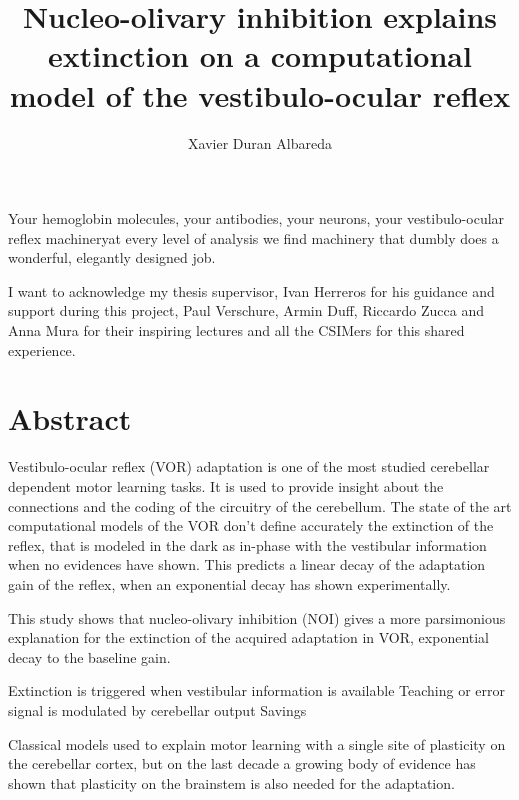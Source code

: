 \documentclass[12pt, a4paper,twoside]{tesi_upf}
\title{Nucleo-olivary inhibition explains extinction on a computational model of the vestibulo-ocular reflex}
\author{Xavier Duran Albareda}
\begin{document}
\frontmatter

\maketitle

\cleardoublepage


\noindent Your hemoglobin molecules, your antibodies, your neurons, your vestibulo-ocular reflex machinery\textemdash at every level of analysis we find machinery that dumbly does a wonderful, elegantly designed job.
\cleardoublepage

\newline

I want to acknowledge my thesis supervisor, Ivan Herreros for his guidance and support during this project, Paul Verschure, Armin Duff, Riccardo Zucca and Anna Mura for their inspiring lectures and all the CSIMers for this shared experience.

\cleardoublepage

\vspace*{\fill}
\section*{\Large \sffamily Abstract}

Vestibulo-ocular reflex (VOR) adaptation is one of the most studied cerebellar dependent motor learning tasks. It is used to provide insight about the connections and the coding of the circuitry of the cerebellum. The state of the art computational models of the VOR don't define accurately the extinction of the reflex, that is modeled in the dark as in-phase with the vestibular information when no evidences have shown. This predicts a linear decay of the adaptation gain of the reflex, when an exponential decay has shown experimentally.

This study shows that nucleo-olivary inhibition (NOI) gives a more parsimonious explanation for the extinction of the acquired adaptation in VOR, exponential decay to the baseline gain.


Extinction is triggered when vestibular information is available
Teaching or error signal is modulated by cerebellar output
Savings

Classical models used to explain motor learning with a single site of plasticity on the cerebellar cortex, but on the last decade a growing body of evidence has shown that plasticity on the brainstem is also needed for the adaptation.
\end{document}
